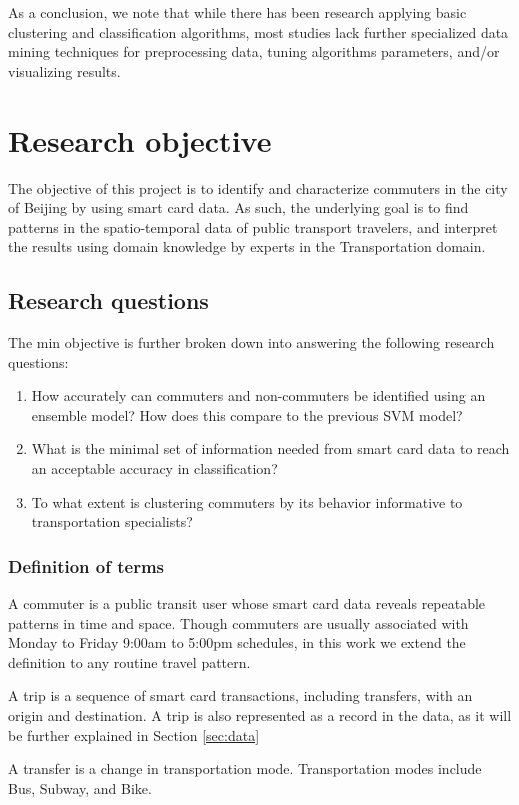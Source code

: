 \documentclass{article}
\begin{document}
As a conclusion, we note that while there has been research applying basic clustering and classification algorithms, most studies lack further specialized data mining techniques for preprocessing data, tuning algorithms parameters, and/or visualizing results. 

\newpage
\section{Research objective}
The objective of this project is to identify and characterize commuters in the city of Beijing by using smart card data. As such, the underlying goal is to find patterns in the spatio-temporal data of public transport travelers, and interpret the results using domain knowledge by experts in the Transportation domain.  

\subsection{Research questions}
The min objective is further broken down into answering the following research questions: 

\begin{enumerate}
\item How accurately can commuters and non-commuters be identified using an ensemble model? How does this compare to the previous SVM model?
\item What is the minimal set of information needed from smart card data to reach an acceptable accuracy in classification?
\item To what extent is clustering commuters by its behavior informative to transportation specialists? 
\end{enumerate}

\subsubsection{Definition of terms}
A commuter is a public transit user whose smart card data reveals repeatable patterns in time and space. Though commuters are usually associated with Monday to Friday 9:00am to 5:00pm schedules, in this work we extend the definition to any routine travel pattern. 

A trip is a sequence of smart card transactions, including transfers, with an origin and destination. A trip is also represented as a record in the data, as it will be further explained in Section \ref{sec:data}

A transfer is a change in transportation mode. Transportation modes include Bus, Subway, and Bike. 
\end{document}

